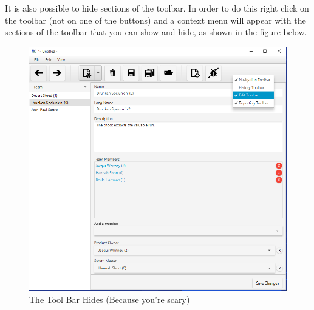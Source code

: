 It is also possible to hide sections of the toolbar. In order to do this right click on the toolbar (not on one of the buttons) and a context menu will appear with the sections of the toolbar that you can show and hide, as shown in the figure below.

\begin{figure}[H]
\centering
\includegraphics[width=\textwidth]{images/screenshots/toolbar1.PNG}
\caption{The Tool Bar Hides (Because you're scary)}
\label{fig:new_project}
\end{figure}